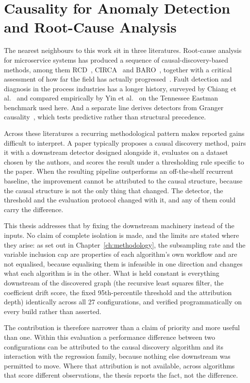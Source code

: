 \section{Causality for Anomaly Detection and Root-Cause Analysis}
\label{sec:rw-causal-ad}

The nearest neighbours to this work sit in three literatures. Root-cause analysis for microservice systems has produced a sequence of causal-discovery-based methods, among them RCD~\cite{ikram2022rcd}, CIRCA~\cite{li2022circa} and BARO~\cite{pham2024baro}, together with a critical assessment of how far the field has actually progressed~\cite{pham2024howfar}. Fault detection and diagnosis in the process industries has a longer history, surveyed by Chiang et al.~\cite{chiang2001faultdetection} and compared empirically by Yin et al.~\cite{yin2012comparison} on the Tennessee Eastman benchmark used here. And a separate line derives detectors from Granger causality~\cite{granger1969causality}, which tests predictive rather than structural precedence.

Across these literatures a recurring methodological pattern makes reported gains difficult to interpret. A paper typically proposes a causal discovery method, pairs it with a downstream detector designed alongside it, evaluates on a dataset chosen by the authors, and scores the result under a thresholding rule specific to the paper. When the resulting pipeline outperforms an off-the-shelf recurrent baseline, the improvement cannot be attributed to the causal structure, because the causal structure is not the only thing that changed. The detector, the threshold and the evaluation protocol changed with it, and any of them could carry the difference.

This thesis addresses that by fixing the downstream machinery instead of the inputs. No claim of complete isolation is made, and the limits are stated where they arise: as set out in Chapter~\ref{ch:methodology}, the subsampling rate and the variable inclusion cap are properties of each algorithm's own workflow and are not equalised, because equalising them is infeasible in one direction and changes what each algorithm is in the other. What is held constant is everything downstream of the discovered graph (the recursive least squares filter, the coefficient drift score, the fixed 95th-percentile threshold and the attribution depth) identically across all 27 configurations, and verified programmatically on every build rather than asserted.

The contribution is therefore narrower than a claim of priority and more useful than one. Within this evaluation a performance difference between two configurations can be attributed to the causal discovery algorithm and its interaction with the regression family, because nothing else downstream was permitted to move. Where that attribution is not available, across algorithms that score different observations, the thesis reports the fact, not the difference.

